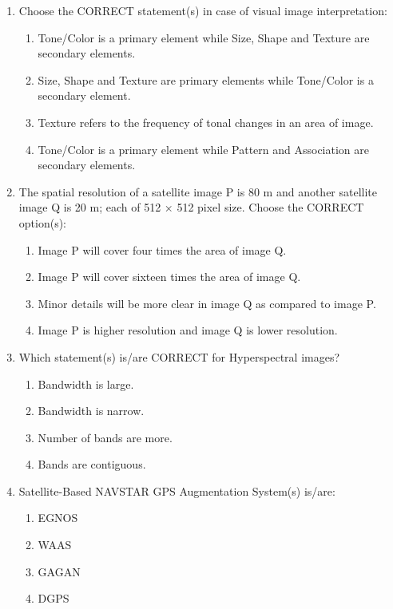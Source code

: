 \documentclass[12pt,a4paper]{article}
\begin{document}
\begin{enumerate}
\item Choose the CORRECT statement(s) in case of visual image interpretation:
\begin{enumerate}
    \item Tone/Color is a primary element while Size, Shape and Texture are secondary elements.
    \item Size, Shape and Texture are primary elements while Tone/Color is a secondary element.
    \item Texture refers to the frequency of tonal changes in an area of image.
    \item Tone/Color is a primary element while Pattern and Association are secondary elements.
\end{enumerate}

\item The spatial resolution of a satellite image P is 80 m and another satellite image Q is 20 m; each of 512 × 512 pixel size. Choose the CORRECT option(s):
\begin{enumerate}
    \item Image P will cover four times the area of image Q.
    \item Image P will cover sixteen times the area of image Q.
    \item Minor details will be more clear in image Q as compared to image P.
    \item Image P is higher resolution and image Q is lower resolution.
\end{enumerate}

\item Which statement(s) is/are CORRECT for Hyperspectral images?
\begin{enumerate}
    \item Bandwidth is large.
    \item Bandwidth is narrow.
    \item Number of bands are more.
    \item Bands are contiguous.
\end{enumerate}

\item Satellite-Based NAVSTAR GPS Augmentation System(s) is/are:
\begin{enumerate}
    \item EGNOS
    \item WAAS
    \item GAGAN
    \item DGPS
\end{enumerate}


\end{enumerate}
\end{document}
